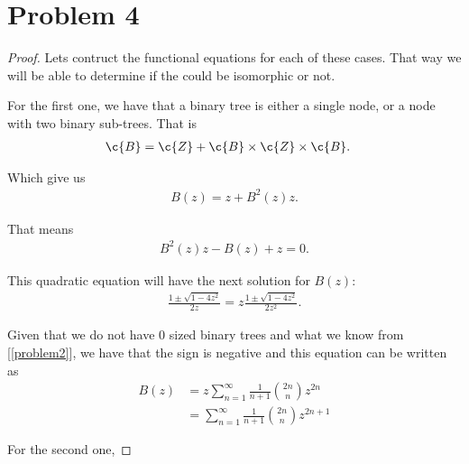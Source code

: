 ﻿\chapter{Problem 4}

\begin{proof}
	Lets contruct the functional equations for each of these cases. That way we will be able to determine if the could be
	isomorphic or not.
	
	For the first one, we have that a binary tree is either a single node, or a node with two binary sub-trees. That is
	\begin{align}
			\c{B}	&=	\c{Z} + \c{B} \times \c{Z} \times \c{B}.
	\end{align}
	
	Which give us
	\begin{align}
			B(z) = z + B^2(z) z.
	\end{align}
	
	That means
	\begin{align}
			B^2(z) z - B(z) + z = 0. 
	\end{align}
	
	This quadratic equation will have the next solution for $B(z)$:
	\begin{align}
			\frac{1 \pm \sqrt{1 - 4 z^2}}{2z} = z \frac{1 \pm \sqrt{1 - 4 z^2}}{2z^2}.
	\end{align}
	
	Given that we do not have $0$ sized binary trees and what we know from [\ref{problem2}], we have that the sign is negative and this equation can be written as
	\begin{align}
			B(z) 	&= z \sum_{n=1}^\infty \frac{1}{n+1}\binom{2n}{n}z^{2n}	\\
						&= \sum_{n=1}^\infty \frac{1}{n+1}\binom{2n}{n}z^{2n + 1}
	\end{align}
	
	For the second one, 
\end{proof}